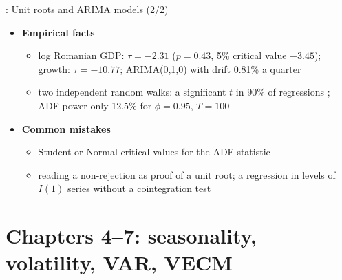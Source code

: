 \begin{frame}{: Unit roots and ARIMA models (2/2)}
\itemsize{\footnotesize}
\begin{itemize}
    \item \textbf{Empirical facts}
    \begin{itemize}
        \item log Romanian GDP: $\tau = \ensuremath{-}2.31$ ($p = 0.43$, 5\% critical value $\ensuremath{-}3.45$); growth: $\tau = \ensuremath{-}10.77$; ARIMA(0,1,0) with drift 0.81\% a quarter
        \item two independent random walks: a significant $t$ in 90\% of regressions ; ADF power only 12.5\% for $\phi = 0.95$, $T = 100$
    \end{itemize}
    \item \textbf{Common mistakes}
    \begin{itemize}
        \item Student or Normal critical values for the ADF statistic
        \item reading a non-rejection as proof of a unit root; a regression in levels of $I(1)$ series without a cointegration test
    \end{itemize}
\end{itemize}
\end{frame}


\section{Chapters 4--7: seasonality, volatility, VAR, VECM}

